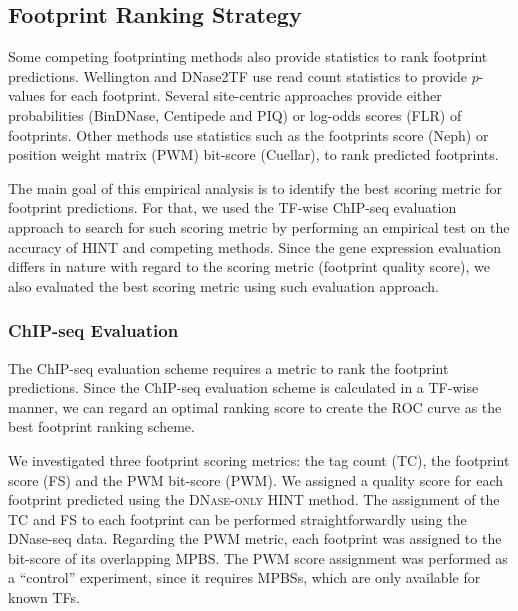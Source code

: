 \subsection{Footprint Ranking Strategy}
\label{sec:footprint.ranking.strategy}

Some competing footprinting methods also provide statistics to rank footprint predictions. Wellington and DNase2TF use read count statistics to provide $p$-values for each footprint. Several site-centric approaches provide either probabilities (BinDNase, Centipede and PIQ) or log-odds scores (FLR) of footprints. Other methods use statistics such as the footprints score (Neph) or position weight matrix (PWM) bit-score (Cuellar), to rank predicted footprints.

The main goal of this empirical analysis is to identify the best scoring metric for footprint predictions. For that, we used the TF-wise ChIP-seq evaluation approach to search for such scoring metric by performing an empirical test on the accuracy of HINT and competing methods. Since the gene expression evaluation differs in nature with regard to the scoring metric (footprint quality score), we also evaluated the best scoring metric using such evaluation approach.

\subsubsection{ChIP-seq Evaluation}

The ChIP-seq evaluation scheme requires a metric to rank the footprint predictions. Since the ChIP-seq evaluation scheme is calculated in a TF-wise manner, we can regard an optimal ranking score to create the ROC curve as the best footprint ranking scheme.

We investigated three footprint scoring metrics: the tag count (TC), the footprint score (FS) and the PWM bit-score (PWM). We assigned a quality score for each footprint predicted using the \textsc{DNase-only} HINT method. The assignment of the TC and FS to each footprint can be performed straightforwardly using the DNase-seq data. Regarding the PWM metric, each footprint was assigned to the bit-score of its overlapping MPBS. The PWM score assignment was performed as a ``control'' experiment, since it requires MPBSs, which are only available for known TFs.

